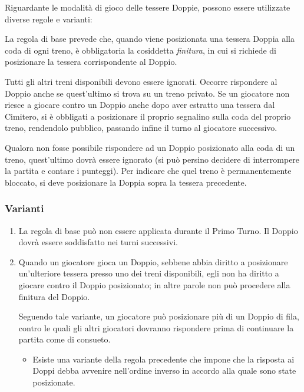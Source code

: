 \documentclass[sigconf,10pt]{acmart}
\begin{document}
Riguardante le modalità di gioco delle tessere Doppie, possono essere utilizzate diverse regole e varianti:

La regola di base prevede che, quando viene posizionata una tessera Doppia alla coda di ogni treno, è obbligatoria la cosiddetta \textit{finitura}, in cui si richiede di posizionare la tessera corrispondente al Doppio.
 
Tutti gli altri treni disponibili devono essere ignorati. Occorre rispondere al Doppio anche se quest'ultimo si trova su un treno privato. Se un giocatore non riesce a giocare contro un Doppio anche dopo aver estratto una tessera dal Cimitero, si è obbligati a posizionare il proprio segnalino sulla coda del proprio treno, rendendolo pubblico, passando infine il turno al giocatore successivo.

Qualora non fosse possibile rispondere ad un Doppio posizionato alla coda di un treno, quest'ultimo dovrà essere ignorato (si può persino decidere di interrompere la partita e contare i punteggi). Per indicare che quel treno è permanentemente bloccato, si deve posizionare la Doppia sopra la tessera precedente.

\subsubsection{Varianti}

\begin{enumerate}
\item La regola di base può non essere applicata durante il Primo Turno. Il Doppio dovrà essere soddisfatto nei turni successivi.

\item Quando un giocatore gioca un Doppio, sebbene abbia diritto a posizionare un'ulteriore tessera presso uno dei treni disponibili, egli non ha diritto a giocare contro il Doppio posizionato; in altre parole non può procedere alla finitura del Doppio.

Seguendo tale variante, un giocatore può posizionare più di un Doppio di fila, contro le quali gli altri giocatori dovranno rispondere prima di continuare la partita come di consueto.

\begin{itemize}
\item Esiste una variante della regola precedente che impone che la risposta ai Doppi debba avvenire nell'ordine inverso in accordo alla quale sono state posizionate.
\end{itemize}

\end{enumerate}
\end{document}
